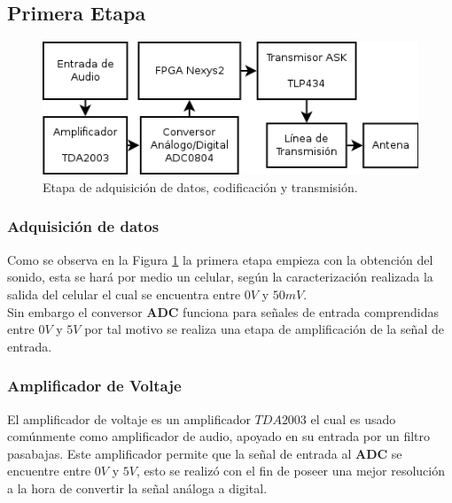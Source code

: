 \documentclass[10pt,graphicx,caption,rotating]{article}
\begin{document}
\subsection{Primera Etapa}

\begin{figure}[H]
	\centering
		\includegraphics[scale=0.55]{Diagrama1.png}
	\caption{Etapa de adquisición de datos, codificación y transmisión.}
	\label{fig1}
\end{figure}

\subsubsection{Adquisición de datos}
\noindent
Como se observa en la Figura \ref{fig1} la primera etapa empieza con la obtención del sonido, esta se hará por medio un celular, según la caracterización realizada la salida del celular el cual se encuentra entre  $0 V$ y $50 mV$.\\ 
Sin embargo el conversor \textbf{ADC} funciona para señales de entrada comprendidas entre $0V$ y $5V$ por tal motivo se realiza una etapa de amplificación de la señal de entrada.

\subsubsection{Amplificador de Voltaje}\label{amp}
\noindent
El amplificador de voltaje es un amplificador $TDA2003$ el cual es usado comúnmente como amplificador de audio, apoyado en su entrada por un filtro pasabajas. Este amplificador permite que la señal de entrada al \textbf{ADC} se encuentre entre $0 V$ y $5 V$, esto se realizó con el fin de poseer una mejor resolución a la hora de convertir la señal análoga a digital. 
\end{document}
